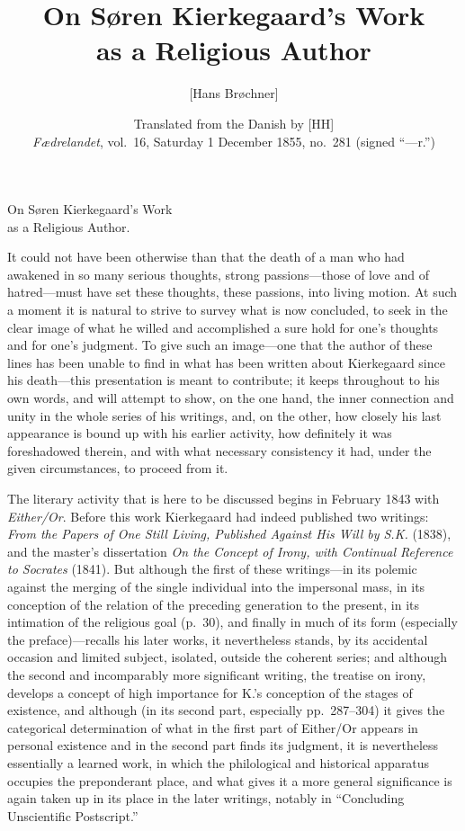\documentclass[12pt,a4paper]{article}
\title{\textbf{On Søren Kierkegaard's Work\\ as a Religious Author}}
\author{[Hans Brøchner]}
\date{Translated from the Danish by [HH]\\[0.3em]
  \emph{Fædrelandet}, vol.\ 16, Saturday 1 December 1855, no.\ 281
  (signed ``---r.'')}
\newcommand{\opage}[1]{\marginnote{\footnotesize\textit{[#1]}}}
\begin{document}
\maketitle
\thispagestyle{fancy}
\bigskip

\opage{1179}

\begin{center}
{\large On Søren Kierkegaard's Work\\
as a Religious Author.}
\end{center}

\noindent It could not have been otherwise than that the death of a man who had
awakened in so many serious thoughts, strong passions---those of love and of
hatred---must have set these thoughts, these passions, into living motion. At such
a moment it is natural to strive to survey what is now concluded, to seek in the
clear image of what he willed and accomplished a sure hold for one's thoughts and
for one's judgment. To give such an image---one that the author of these lines has
been unable to find in what has been written about Kierkegaard since his
death---this presentation is meant to contribute; it keeps throughout to his own
words, and will attempt to show, on the one hand, the inner connection and unity
in the whole series of his writings, and, on the other, how closely his last
appearance is bound up with his earlier activity, how definitely it was
foreshadowed therein, and with what necessary consistency it had, under the given
circumstances, to proceed from it.

The literary activity that is here to be discussed begins in February 1843 with
\emph{Either/Or}. Before this work Kierkegaard had indeed published two writings:
\emph{From the Papers of One Still Living, Published Against His Will by S.K.}
(1838), and the master's dissertation \emph{On the Concept of Irony, with
Continual Reference to Socrates} (1841). But although the first of these
writings---in its polemic against the merging of the single individual into the
impersonal mass, in its conception of the relation of the preceding generation to
the present, in its intimation of the religious goal (p.\ 30), and finally in much
of its form (especially the preface)---recalls his later works, it nevertheless
stands, by its accidental occasion and limited subject, isolated, outside the
coherent series; and although the second and incomparably more significant
writing, the treatise on irony, develops a concept of high importance for K.'s
conception of the stages of existence, and although (in its second part,
especially pp.\ 287--304) it gives the categorical determination of what in the
first part of Either/Or appears in personal existence and in the second
part finds its judgment, it is nevertheless essentially a learned work, in which
the philological and historical apparatus occupies the preponderant place, and
what gives it a more general significance is again taken up in its place in the
later writings, notably in ``Concluding Unscientific Postscript.''
\end{document}
